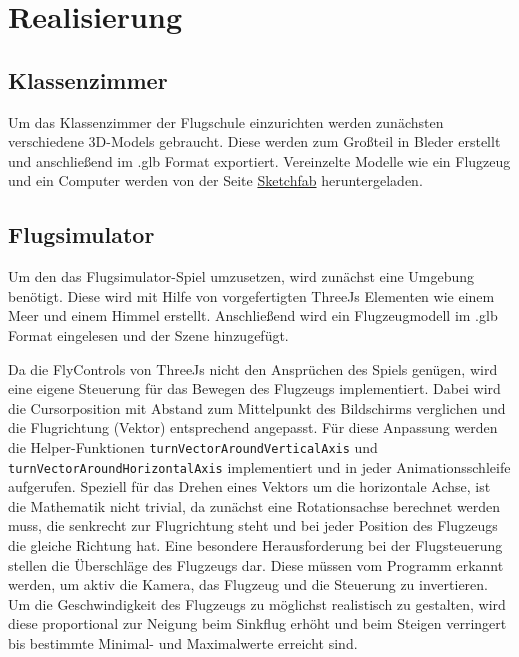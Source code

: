 \section{Realisierung}
\subsection{Klassenzimmer}

Um das Klassenzimmer der Flugschule einzurichten werden zunächsten verschiedene 3D-Models gebraucht.
Diese werden zum Großteil in Bleder erstellt und anschließend im .glb Format exportiert.
Vereinzelte Modelle wie ein Flugzeug und ein Computer werden von der Seite \href{https://scetchfab.com}{Sketchfab} heruntergeladen. 

\subsection{Flugsimulator}

Um den das Flugsimulator-Spiel umzusetzen, wird zunächst eine Umgebung benötigt.
Diese wird mit Hilfe von vorgefertigten ThreeJs Elementen wie einem Meer und einem Himmel erstellt.
Anschließend wird ein Flugzeugmodell im .glb Format eingelesen und der Szene hinzugefügt.

Da die FlyControls von ThreeJs nicht den Ansprüchen des Spiels genügen, wird eine eigene Steuerung für das Bewegen des Flugzeugs implementiert.
Dabei wird die Cursorposition mit Abstand zum Mittelpunkt des Bildschirms verglichen und die Flugrichtung (Vektor) entsprechend angepasst.
Für diese Anpassung werden die Helper-Funktionen \texttt{turnVectorAroundVerticalAxis} und \texttt{turnVectorAroundHorizontalAxis} implementiert und in jeder Animationsschleife aufgerufen.
Speziell für das Drehen eines Vektors um die horizontale Achse, ist die Mathematik nicht trivial, da zunächst eine Rotationsachse berechnet werden muss, die senkrecht zur Flugrichtung steht und bei jeder Position des Flugzeugs die gleiche Richtung hat.
Eine besondere Herausforderung bei der Flugsteuerung stellen die Überschläge des Flugzeugs dar.
Diese müssen vom Programm erkannt werden, um aktiv die Kamera, das Flugzeug und die Steuerung zu invertieren.
Um die Geschwindigkeit des Flugzeugs zu möglichst realistisch zu gestalten, wird diese proportional zur Neigung beim Sinkflug erhöht und beim Steigen verringert bis bestimmte Minimal- und Maximalwerte erreicht sind.

